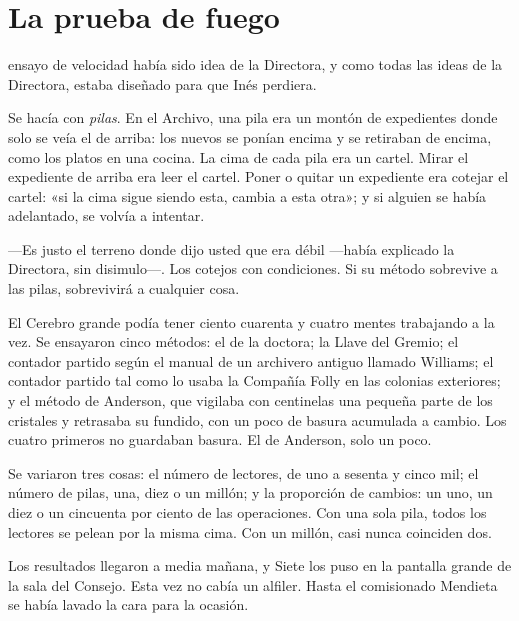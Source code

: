 \chapter{La prueba de fuego}

 ensayo de velocidad había sido idea de la Directora, y como todas las ideas de la Directora, estaba diseñado para que Inés perdiera.

Se hacía con \emph{pilas}. En el Archivo, una pila era un montón de expedientes donde solo se veía el de arriba: los nuevos se ponían encima y se retiraban de encima, como los platos en una cocina. La cima de cada pila era un cartel. Mirar el expediente de arriba era leer el cartel. Poner o quitar un expediente era cotejar el cartel: «si la cima sigue siendo esta, cambia a esta otra»; y si alguien se había adelantado, se volvía a intentar.

---Es justo el terreno donde dijo usted que era débil ---había explicado la Directora, sin disimulo---\nobreak. Los cotejos con condiciones. Si su método sobrevive a las pilas, sobrevivirá a cualquier cosa.

El Cerebro grande podía tener ciento cuarenta y cuatro mentes trabajando a la vez. Se ensayaron cinco métodos: el de la doctora; la Llave del Gremio; el contador partido según el manual de un archivero antiguo llamado Williams; el contador partido tal como lo usaba la Compañía Folly en las colonias exteriores; y el método de Anderson, que vigilaba con centinelas una pequeña parte de los cristales y retrasaba su fundido, con un poco de basura acumulada a cambio. Los cuatro primeros no guardaban basura. El de Anderson, solo un poco.

Se variaron tres cosas: el número de lectores, de uno a sesenta y cinco mil; el número de pilas, una, diez o un millón; y la proporción de cambios: un uno, un diez o un cincuenta por ciento de las operaciones. Con una sola pila, todos los lectores se pelean por la misma cima. Con un millón, casi nunca coinciden dos.

\escena
Los resultados llegaron a media mañana, y Siete los puso en la pantalla grande de la sala del Consejo. Esta vez no cabía un alfiler. Hasta el comisionado Mendieta se había lavado la cara para la ocasión.

